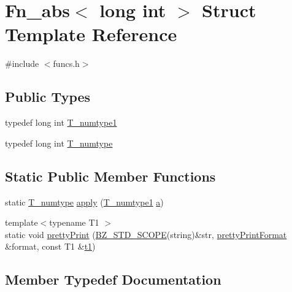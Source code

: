 \hypertarget{structFn__abs_3_01long_01int_01_4}{}\section{Fn\+\_\+abs$<$ long int $>$ Struct Template Reference}
\label{structFn__abs_3_01long_01int_01_4}


{\ttfamily \#include $<$funcs.\+h$>$}

\subsection*{Public Types}
\begin{DoxyCompactItemize}
\item 
typedef long int \hyperlink{structFn__abs_3_01long_01int_01_4_a1605b8dabc3fa39924b711cda23596c5}{T\+\_\+numtype1}
\item 
typedef long int \hyperlink{structFn__abs_3_01long_01int_01_4_a6d850a26314e95f9ac4e1f42aa6f19a0}{T\+\_\+numtype}
\end{DoxyCompactItemize}
\subsection*{Static Public Member Functions}
\begin{DoxyCompactItemize}
\item 
static \hyperlink{structFn__abs_3_01long_01int_01_4_a6d850a26314e95f9ac4e1f42aa6f19a0}{T\+\_\+numtype} \hyperlink{structFn__abs_3_01long_01int_01_4_a9ce1b8472e4f6e7f24d1c965ba65c83a}{apply} (\hyperlink{structFn__abs_3_01long_01int_01_4_a1605b8dabc3fa39924b711cda23596c5}{T\+\_\+numtype1} \hyperlink{gen__mat5files_8m_aae328bf20413f220e38aec4d95bfd6da}{a})
\item 
{\footnotesize template$<$typename T1 $>$ }\\static void \hyperlink{structFn__abs_3_01long_01int_01_4_adb075f8277ef455990ae55d01b46d669}{pretty\+Print} (\hyperlink{numinquire_8h_a2b24ffc3b4ef9803956bc7715c6c7b83}{B\+Z\+\_\+\+S\+T\+D\+\_\+\+S\+C\+O\+P\+E}(string)\&str, \hyperlink{classprettyPrintFormat}{pretty\+Print\+Format} \&format, const T1 \&\hyperlink{sparse_2linalg_2eigen_2arpack_2ARPACK_2SRC_2stat_8h_af377a4e2b03dbeb6590856bdfca3df30}{t1})
\end{DoxyCompactItemize}


\subsection{Member Typedef Documentation}
\hypertarget{structFn__abs_3_01long_01int_01_4_a6d850a26314e95f9ac4e1f42aa6f19a0}{}
